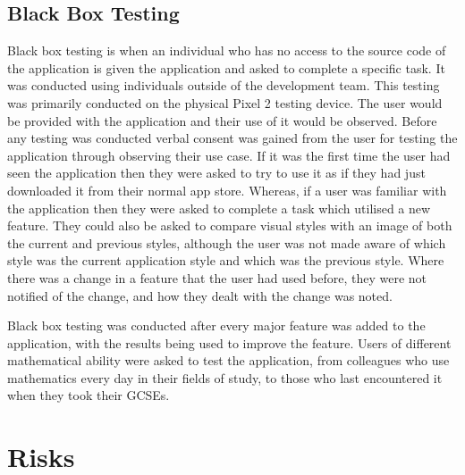 \documentclass{article}
\begin{document}
\subsection{Black Box Testing}

Black box testing is when an individual who has no access to the source code of the application is given the application and asked to complete a specific task. It was conducted using individuals outside of the development team. This testing was primarily conducted on the physical Pixel 2 testing device. The user would be provided with the application and their use of it would be observed. Before any testing was conducted verbal consent was gained from the user for testing the application through observing their use case. If it was the first time the user had seen the application then they were asked to try to use it as if they had just downloaded it from their normal app store. Whereas, if a user was familiar with the application then they were asked to complete a task which utilised a new feature. They could also be asked to compare visual styles with an image of both the current and previous styles, although the user was not made aware of which style was the current application style and which was the previous style. Where there was a change in a feature that the user had used before, they were not notified of the change, and how they dealt with the change was noted. \par

Black box testing was conducted after every major feature was added to the application, with the results being used to improve the feature. Users of different mathematical ability were asked to test the application, from colleagues who use mathematics every day in their fields of study, to those who last encountered it when they took their GCSEs. \par

\section{Risks}
\label{section:risks}
\end{document}
